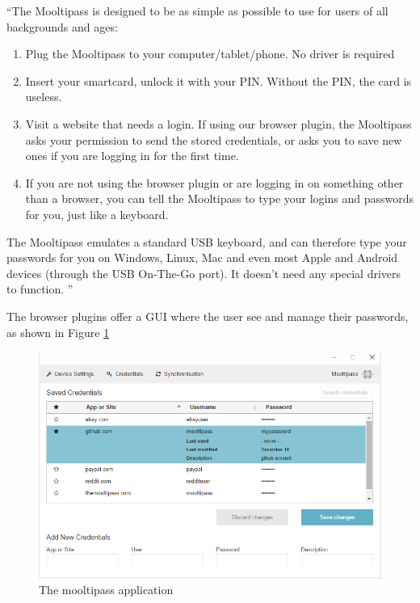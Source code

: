 ``The Mooltipass is designed to be as simple as possible to use for users of all backgrounds and ages:
\begin{enumerate}
\setlength\itemsep{-3pt}

\item Plug the Mooltipass to your computer/tablet/phone. No driver is required
\item Insert your smartcard, unlock it with your PIN. Without the PIN, the card is useless.
\item Visit a website that needs a login. If using our browser plugin, the Mooltipass asks your permission to send the stored credentials, or asks you to save new ones if you are logging in for the first time.
\item If you are not using the browser plugin or are logging in on something other than a browser, you can tell the Mooltipass to type your logins and passwords for you, just like a keyboard.
\end{enumerate}

The Mooltipass emulates a standard USB keyboard, and can therefore type your passwords for you on Windows, Linux, Mac and even most Apple and Android devices (through the USB On-The-Go port). It doesn't need any special drivers to function. ''

The browser plugins offer a GUI where the user see and manage their passwords, as shown in Figure \ref{fig:mpapp}

\begin{figure}[htb]
  \centering
  \captionsetup{justification=centering}
  \centerline{\includegraphics[width=0.9\columnwidth]{chapters/figures/related/mpapp.png}}
  \caption{The mooltipass application}
  \label{fig:mpapp}
\end{figure}

